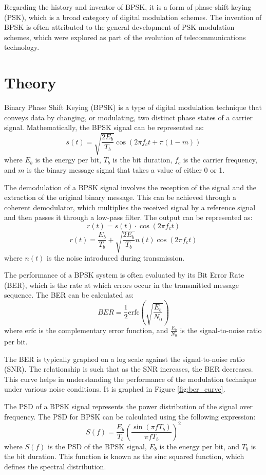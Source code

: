 \documentclass[11pt]{article}
\begin{document}
Regarding the history and inventor of BPSK, it is a form of phase-shift keying (PSK), which is a broad category of digital modulation schemes. The invention of BPSK is often attributed to the general development of PSK modulation schemes, which were explored as part of the evolution of telecommunications technology.


\section*{Theory}
Binary Phase Shift Keying (BPSK) is a type of digital modulation technique that conveys data by changing, or modulating, two distinct phase states of a carrier signal. Mathematically, the BPSK signal can be represented as:
\[ s(t) = \sqrt{\frac{2E_b}{T_b}} \cos(2\pi f_c t + \pi(1-m)) \]
where \( E_b \) is the energy per bit, \( T_b \) is the bit duration, \( f_c \) is the carrier frequency, and \( m \) is the binary message signal that takes a value of either 0 or 1.
\newline

The demodulation of a BPSK signal involves the reception of the signal and the extraction of the original binary message. This can be achieved through a coherent demodulator, which multiplies the received signal by a reference signal and then passes it through a low-pass filter. The output can be represented as:
\[ r(t) = s(t) \cdot \cos(2\pi f_c t) \]
\[ r(t) = \frac{E_b}{T_b} + \sqrt{\frac{2E_b}{T_b}} n(t) \cos(2\pi f_c t) \]
where \( n(t) \) is the noise introduced during transmission.
\newline

The performance of a BPSK system is often evaluated by its Bit Error Rate (BER), which is the rate at which errors occur in the transmitted message sequence. The BER can be calculated as:
\[ BER = \frac{1}{2} \text{erfc}\left(\sqrt{\frac{E_b}{N_0}}\right) \]
where \( \text{erfc} \) is the complementary error function, and \( \frac{E_b}{N_0} \) is the signal-to-noise ratio per bit.
\newline

The BER is typically graphed on a log scale against the signal-to-noise ratio (SNR). The relationship is such that as the SNR increases, the BER decreases. This curve helps in understanding the performance of the modulation technique under various noise conditions. It is graphed in Figure \ref{fig:ber_curve}.

The PSD of a BPSK signal represents the power distribution of the signal over frequency. The PSD for BPSK can be calculated using the following expression:
\[ S(f) = \frac{E_b}{T_b} \left(\frac{\sin(\pi f T_b)}{\pi f T_b}\right)^2 \]
where \( S(f) \) is the PSD of the BPSK signal, \( E_b \) is the energy per bit, and \( T_b \) is the bit duration. This function is known as the sinc squared function, which defines the spectral distribution.
\newline
\end{document}
